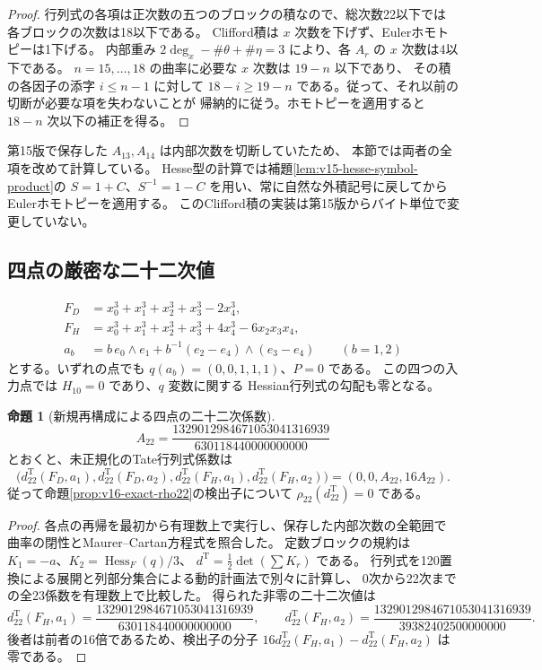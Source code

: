 \documentclass[a4paper,11pt]{ltjsarticle}
\theoremstyle{definition}
\newtheorem{proposition}[theorem]{命題}
\begin{document}
\begin{proof}
行列式の各項は正次数の五つのブロックの積なので、総次数22以下では
各ブロックの次数は18以下である。
Clifford積は $x$ 次数を下げず、Eulerホモトピーは1下げる。
内部重み $2\deg_x-\#\theta+\#\eta=3$ により、各 $A_r$ の
$x$ 次数は4以下である。
$n=15,\ldots,18$ の曲率に必要な $x$ 次数は $19-n$ 以下であり、
その積の各因子の添字 $i\le n-1$ に対して
$18-i\ge19-n$ である。従って、それ以前の切断が必要な項を失わないことが
帰納的に従う。ホモトピーを適用すると $18-n$ 次以下の補正を得る。
\end{proof}

第15版で保存した $A_{13},A_{14}$ は内部次数を切断していたため、
本節では両者の全項を改めて計算している。
Hesse型の計算では補題\ref{lem:v15-hesse-symbol-product}の
$S=1+C$、$S^{-1}=1-C$ を用い、常に自然な外積記号に戻してから
Eulerホモトピーを適用する。
このClifford積の実装は第15版からバイト単位で変更していない。

\subsection{四点の厳密な二十二次値}

\[
\begin{split}
 F_D&=x_0^3+x_1^3+x_2^3+x_3^3-2x_4^3,\\
 F_H&=x_0^3+x_1^3+x_2^3+x_3^3+4x_4^3-6x_2x_3x_4,\\
 a_b&=b\,e_0\wedge e_1+
       b^{-1}(e_2-e_4)\wedge(e_3-e_4)\qquad(b=1,2)
\end{split}
\]
とする。いずれの点でも $q(a_b)=(0,0,1,1,1)$、$P=0$ である。
この四つの入力点では $H_{10}=0$ であり、$q$ 変数に関する
Hessian行列式の勾配も零となる。

\begin{proposition}[新規再構成による四点の二十二次係数]
\label{prop:v16-fresh-tate22-values}
\[
 A_{22}=\frac{1329012984671053041316939}{630118440000000000}
\]
とおくと、未正規化のTate行列式係数は
\[
\boxed{\bigl(d_{22}^{\mathrm T}(F_D,a_1),d_{22}^{\mathrm T}(F_D,a_2),
             d_{22}^{\mathrm T}(F_H,a_1),d_{22}^{\mathrm T}(F_H,a_2)\bigr)
       =(0,0,A_{22},16A_{22}).}
\]
従って命題\ref{prop:v16-exact-rho22}の検出子について
$\rho_{22}(d_{22}^{\mathrm T})=0$ である。
\end{proposition}

\begin{proof}
各点の再帰を最初から有理数上で実行し、保存した内部次数の全範囲で
曲率の閉性とMaurer--Cartan方程式を照合した。
定数ブロックの規約は $K_1=-a$、$K_2=\operatorname{Hess}_F(q)/3$、
$d^{\mathrm T}=\frac12\det(\sum K_r)$ である。
行列式を120置換による展開と列部分集合による動的計画法で別々に計算し、
0次から22次までの全23係数を有理数上で比較した。
得られた非零の二十二次値は
\[
 d_{22}^{\mathrm T}(F_H,a_1)
   =\frac{1329012984671053041316939}{630118440000000000},\qquad
 d_{22}^{\mathrm T}(F_H,a_2)
   =\frac{1329012984671053041316939}{39382402500000000}.
\]
後者は前者の16倍であるため、検出子の分子
$16d_{22}^{\mathrm T}(F_H,a_1)-d_{22}^{\mathrm T}(F_H,a_2)$ は零である。
\end{proof}
\end{document}
